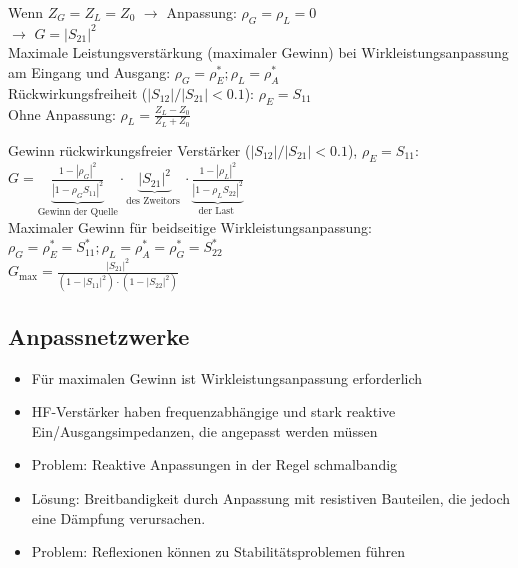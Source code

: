 \documentclass[english]{latex4ei/latex4ei_sheet}
\begin{document}
\begin{sectionbox}
    Wenn $Z_G = Z_L = Z_0$ $\rightarrow$ Anpassung: $\rho_G = \rho_L = 0$\\
    $\rightarrow$ $G = |S_{21}|^2$\\

    Maximale Leistungsverstärkung (maximaler Gewinn) bei Wirkleistungsanpassung am Eingang und Ausgang:
    $\rho_{G}=\rho_{E}^{*} ; \rho_{L}=\rho_{A}^{*}$\\

    Rückwirkungsfreiheit ($|S_{12}| / |S_{21}| < 0.1$): $\rho_{E} = S_{11}$\\

    Ohne Anpassung: $\rho_{L} = \frac{Z_{L}-Z_{0}}{Z_{L}+Z_{0}}$ \\
    \begin{emphbox}
        Gewinn rückwirkungsfreier Verstärker ($|S_{12}| / |S_{21}| < 0.1$), $\rho_{E}=S_{11}$:\\
        $G=\underbrace{\frac{1-\left|\rho_{G}\right|^{2}} {\left|1-\rho_{G} S_{11}\right|^{2}}}_{\text{Gewinn der Quelle}}\cdot \underbrace{\left|S_{21}\right|^{2}}_{\text {des Zweitors }} \cdot  \underbrace{\frac{1-\left|\rho_{L}\right|^{2}}{\left|1-\rho_{L} S_{22}\right|^{2}}}_{\text {der Last }}$\\

        Maximaler Gewinn für beidseitige Wirkleistungsanpassung: $\rho_{G}=\rho_{E}^{*}=S_{11}^{*} ; \rho_{L}=\rho_{A}^{*}=\rho_{G}^{*}=S_{22}^{*}$\\
        $G_{\max }=\frac{\left|S_{21}\right|^{2}}{\left(1-\left|S_{11}\right|^{2}\right) \cdot\left(1-\left|S_{22}\right|^{2}\right)}$
    \end{emphbox}
\end{sectionbox}
\begin{sectionbox}
    \subsection{Anpassnetzwerke}
    \begin{itemize}
        \item Für maximalen Gewinn ist Wirkleistungsanpassung erforderlich
        \item HF-Verstärker haben frequenzabhängige und stark reaktive Ein/Ausgangsimpedanzen, die angepasst werden müssen
        \item Problem: Reaktive Anpassungen in der Regel schmalbandig
        \item Lösung: Breitbandigkeit durch Anpassung mit resistiven Bauteilen, die jedoch eine Dämpfung verursachen.
        \item Problem: Reflexionen können zu Stabilitätsproblemen führen
    \end{itemize}
\end{sectionbox}
\end{document}
